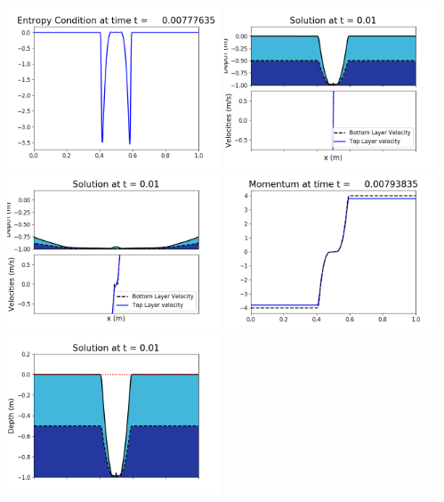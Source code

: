 \documentclass[11pt]{article}
\begin{document}
\vskip 10pt 
\includegraphics[width=0.475\textwidth]{frame0049fig1009.png}
\vskip 10pt 
\includegraphics[width=0.475\textwidth]{frame0050fig1001.png}
\includegraphics[width=0.475\textwidth]{frame0050fig1002.png}
\vskip 10pt 
\includegraphics[width=0.475\textwidth]{frame0050fig1003.png}
\includegraphics[width=0.475\textwidth]{frame0050fig1006.png}
\end{document}
